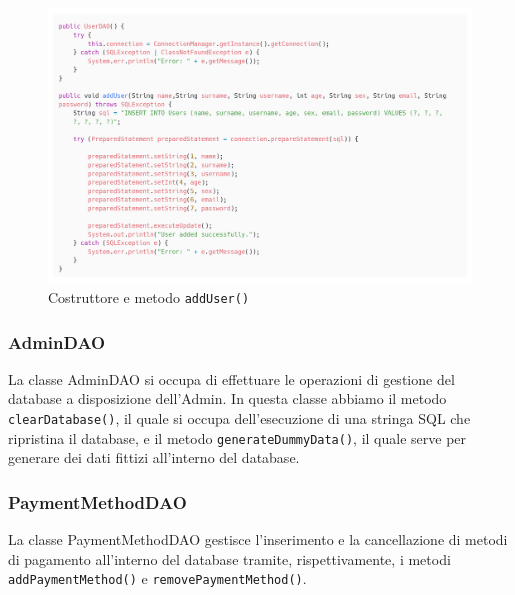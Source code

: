 \documentclass{article}
\begin{document}
\begin{figure}[!h]
    \includegraphics[width=1.0\linewidth]{imgs/snippets/Code_ClassUserDAO.png}
    \caption{Costruttore e metodo \texttt{addUser()}}
    \label{code_classUserDAO}
\end{figure}

\subsubsection{AdminDAO}
La classe AdminDAO si occupa di effettuare le operazioni di gestione del database a disposizione dell'Admin. In questa classe abbiamo il metodo \texttt{clearDatabase()}, il quale si occupa dell'esecuzione di una stringa SQL che ripristina il database, e il metodo \texttt{generateDummyData()}, il quale serve per generare dei dati fittizi all'interno del database.

\subsubsection{PaymentMethodDAO}
La classe PaymentMethodDAO gestisce l'inserimento e la cancellazione di metodi di pagamento all'interno del database tramite, rispettivamente, i metodi \texttt{addPaymentMethod()} e \texttt{removePaymentMethod()}.
\end{document}
